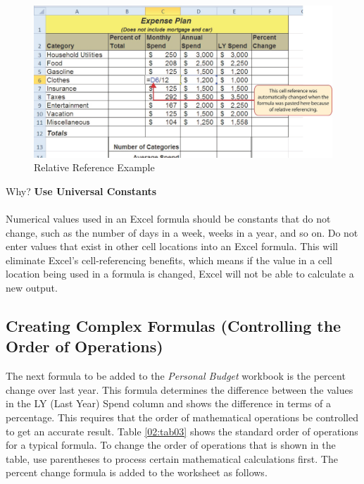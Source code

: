 \begin{figure}[H]
	\centering
	\includegraphics[width=\maxwidth{.95\linewidth}]{gfx/ch02_fig05}
	\caption{Relative Reference Example}
	\label{02:fig05}
\end{figure}

\begin{center}
	\begin{infobox}{Why?}
		\textbf{Use Universal Constants}
		\\
		\\
		Numerical values used in an Excel formula should be constants that do not change, such as the number of days in a week, weeks in a year, and so on. Do not enter values that exist in other cell locations into an Excel formula. This will eliminate Excel's cell-referencing benefits, which means if the value in a cell location being used in a formula is changed, Excel will not be able to calculate a new output.
	\end{infobox}
\end{center}

\subsection{Creating Complex Formulas (Controlling the Order of Operations)}

The next formula to be added to the \textit{Personal Budget} workbook is the percent change over last year. This formula determines the difference between the values in the LY (Last Year) Spend column and shows the difference in terms of a percentage. This requires that the order of mathematical operations be controlled to get an accurate result. Table \ref{02:tab03} shows the standard order of operations for a typical formula. To change the order of operations that is shown in the table, use parentheses to process certain mathematical calculations first. The percent change formula is added to the worksheet as follows.

